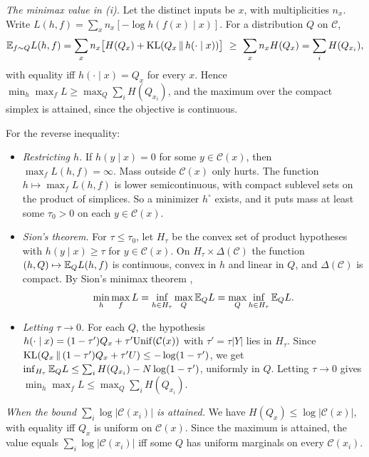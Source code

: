 \emph{The minimax value in (i).} Let the distinct inputs be $x$, with multiplicities $n_x$. Write $L(h,f)=\sum_xn_x[-\log h(f(x)\mid x)]$. For a distribution $Q$ on $\mathcal C$,
\[
\E_{f\sim Q}L(h,f)=\sum_xn_x\big[H(Q_x)+\KL(Q_x\,\|\,h(\cdot\mid x))\big]\ \ge\ \sum_xn_xH(Q_x)=\sum_iH(Q_{x_i}),
\]
with equality iff $h(\cdot\mid x)=Q_x$ for every $x$. Hence $\min_h\max_fL\ge\max_Q\sum_iH(Q_{x_i})$, and the maximum over the compact simplex is attained, since the objective is continuous.

For the reverse inequality:
\begin{itemize}
\item \emph{Restricting $h$.} If $h(y\mid x)=0$ for some $y\in\mathcal C(x)$, then $\max_fL(h,f)=\infty$. Mass outside $\mathcal C(x)$ only hurts. The function $h\mapsto\max_fL(h,f)$ is lower semicontinuous, with compact sublevel sets on the product of simplices. So a minimizer $h^\circ$ exists, and it puts mass at least some $\tau_0>0$ on each $y\in\mathcal C(x)$.
\item \emph{Sion's theorem.} For $\tau\le\tau_0$, let $H_\tau$ be the convex set of product hypotheses with $h(y\mid x)\ge\tau$ for $y\in\mathcal C(x)$. On $H_\tau\times\Delta(\mathcal C)$ the function $(h,Q)\mapsto\mathbb{E}_QL(h,f)$ is continuous, convex in $h$ and linear in $Q$, and $\Delta(\mathcal C)$ is compact. By Sion's minimax theorem \citep{sion1958general},
\[
\min_h\max_fL=\inf_{h\in H_\tau}\max_Q\mathbb{E}_QL=\max_Q\inf_{h\in H_\tau}\mathbb{E}_QL.
\]
\item \emph{Letting $\tau\to0$.} For each $Q$, the hypothesis $h(\cdot\mid x)=(1-\tau')Q_x+\tau'\mathrm{Unif}(\mathcal C(x))$ with $\tau'=\tau|Y|$ lies in $H_\tau$. Since $\mathrm{KL}(Q_x\,\|\,(1-\tau')Q_x+\tau'U)\le-\log(1-\tau')$, we get $\inf_{H_\tau}\mathbb{E}_QL\le\sum_iH(Q_{x_i})-N\log(1-\tau')$, uniformly in $Q$. Letting $\tau\to0$ gives $\min_h\max_fL\le\max_Q\sum_iH(Q_{x_i})$.
\end{itemize}

\emph{When the bound $\sum_i\log|\mathcal C(x_i)|$ is attained.} We have $H(Q_x)\le\log|\mathcal C(x)|$, with equality iff $Q_x$ is uniform on $\mathcal C(x)$. Since the maximum is attained, the value equals $\sum_i\log|\mathcal C(x_i)|$ iff some $Q$ has uniform marginals on every $\mathcal C(x_i)$.

